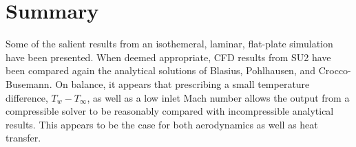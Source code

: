 \documentclass[12pt,letterpaper]{article}
\begin{document}
\section*{Summary}
Some of the salient results from an isothemeral, laminar, flat-plate simulation have been presented. When deemed appropriate, CFD results from SU2 have been compared again the analytical solutions of Blasius, Pohlhausen, and Crocco-Busemann. On balance, it appears that prescribing a small temperature difference, $T_w-T_\infty$, as well as a low inlet Mach number allows the output from a compressible solver to be reasonably compared with incompressible analytical results. This appears to be the case for both aerodynamics as well as heat transfer.
\end{document}
